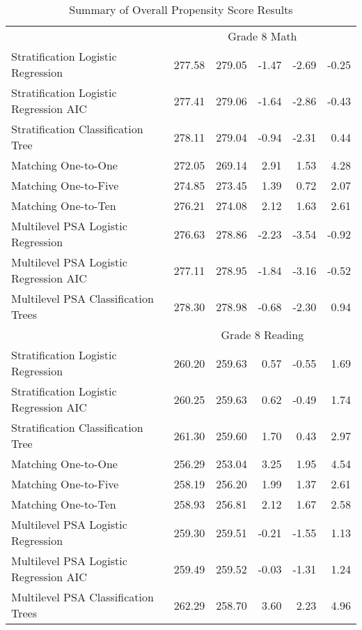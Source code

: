 \begin{table}[ht]
\begin{tabular}{lrrrrr}
    \hline & \multicolumn{5}{c}{Grade 8 Math} \\ \cline{2-6} Stratification Logistic Regression & 277.58 & 279.05 & -1.47 & -2.69 & -0.25 \\ 
  Stratification Logistic Regression AIC & 277.41 & 279.06 & -1.64 & -2.86 & -0.43 \\ 
  Stratification Classification Tree & 278.11 & 279.04 & -0.94 & -2.31 & 0.44 \\ 
  Matching One-to-One & 272.05 & 269.14 & 2.91 & 1.53 & 4.28 \\ 
  Matching One-to-Five & 274.85 & 273.45 & 1.39 & 0.72 & 2.07 \\ 
  Matching One-to-Ten & 276.21 & 274.08 & 2.12 & 1.63 & 2.61 \\ 
  Multilevel PSA Logistic Regression & 276.63 & 278.86 & -2.23 & -3.54 & -0.92 \\ 
  Multilevel PSA Logistic Regression AIC & 277.11 & 278.95 & -1.84 & -3.16 & -0.52 \\ 
  Multilevel PSA Classification Trees & 278.30 & 278.98 & -0.68 & -2.30 & 0.94 \\ 
    \hline & \multicolumn{5}{c}{Grade 8 Reading} \\ \cline{2-6} Stratification Logistic Regression & 260.20 & 259.63 & 0.57 & -0.55 & 1.69 \\ 
  Stratification Logistic Regression AIC & 260.25 & 259.63 & 0.62 & -0.49 & 1.74 \\ 
  Stratification Classification Tree & 261.30 & 259.60 & 1.70 & 0.43 & 2.97 \\ 
  Matching One-to-One & 256.29 & 253.04 & 3.25 & 1.95 & 4.54 \\ 
  Matching One-to-Five & 258.19 & 256.20 & 1.99 & 1.37 & 2.61 \\ 
  Matching One-to-Ten & 258.93 & 256.81 & 2.12 & 1.67 & 2.58 \\ 
  Multilevel PSA Logistic Regression & 259.30 & 259.51 & -0.21 & -1.55 & 1.13 \\ 
  Multilevel PSA Logistic Regression AIC & 259.49 & 259.52 & -0.03 & -1.31 & 1.24 \\ 
  Multilevel PSA Classification Trees & 262.29 & 258.70 & 3.60 & 2.23 & 4.96 \\ 
   \hline
\end{tabular}
\caption{Summary of Overall Propensity Score Results} 
\label{tab:overall}
\end{table}

